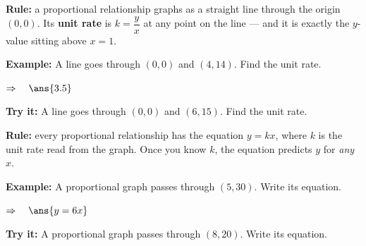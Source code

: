 \documentclass[12pt]{article}
\begin{document}


\begin{formulabox}
\textbf{Rule:} a proportional relationship graphs as a straight line through
the origin $(0,0)$. Its \textbf{unit rate} is $k = \dfrac{y}{x}$ at any point
on the line --- and it is exactly the $y$-value sitting above $x = 1$.
\end{formulabox}

\begin{examplebox}
\textbf{Example:} \quad A line goes through $(0,0)$ and $(4, 14)$. Find the
unit rate.

$\Rightarrow\quad \ans{3.5}$
\end{examplebox}

\begin{tryitbox}
\textbf{Try it:} \quad A line goes through $(0,0)$ and $(6, 15)$. Find the
unit rate.\\[2pt]
\end{tryitbox}


\begin{formulabox}
\textbf{Rule:} every proportional relationship has the equation $y = kx$,
where $k$ is the unit rate read from the graph. Once you know $k$, the
equation predicts $y$ for \emph{any} $x$.
\end{formulabox}

\begin{examplebox}
\textbf{Example:} \quad A proportional graph passes through $(5, 30)$. Write
its equation.

$\Rightarrow\quad \ans{y = 6x}$
\end{examplebox}

\begin{tryitbox}
\textbf{Try it:} \quad A proportional graph passes through $(8, 20)$. Write
its equation.\\[2pt]
\end{tryitbox}
\end{document}
